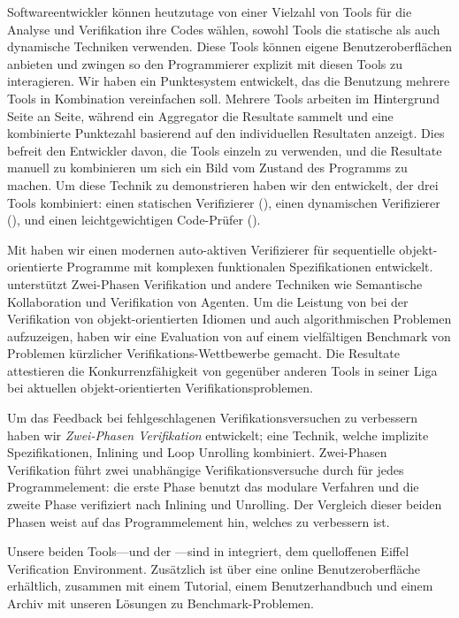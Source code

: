 Softwareentwickler k\"onnen heutzutage von einer Vielzahl von Tools f\"ur die Analyse und Verifikation ihre Codes w\"ahlen, sowohl Tools die statische als auch dynamische Techniken verwenden.
Diese Tools k\"onnen eigene Benutzeroberfl\"achen anbieten und zwingen so den Programmierer explizit mit diesen Tools zu interagieren.
Wir haben ein Punktesystem entwickelt, das die Benutzung mehrere Tools in Kombination vereinfachen soll.
Mehrere Tools arbeiten im Hintergrund Seite an Seite, w\"ahrend ein Aggregator die Resultate sammelt und eine kombinierte Punktezahl basierend auf den individuellen Resultaten anzeigt.
Dies befreit den Entwickler davon, die Tools einzeln zu verwenden, und die Resultate manuell zu kombinieren um sich ein Bild vom Zustand des Programms zu machen.
Um diese Technik zu demonstrieren haben wir den \VAssist entwickelt, der drei Tools kombiniert: einen statischen Verifizierer (\AutoProof), einen dynamischen Verifizierer (\AutoTest), und einen leichtgewichtigen Code-Pr\"ufer (\Inspector).

Mit \AutoProof haben wir einen modernen auto-aktiven Verifizierer f\"ur sequentielle objekt-orientierte Programme mit komplexen funktionalen Spezifikationen entwickelt.
\AutoProof unterst\"utzt Zwei-Phasen Verifikation und andere Techniken wie Semantische Kollaboration und Verifikation von Agenten. Um die Leistung von \AutoProof bei der Verifikation von objekt-orientierten Idiomen und auch algorithmischen Problemen aufzuzeigen, haben wir eine Evaluation von \AutoProof auf einem vielf\"altigen Benchmark von Problemen k\"urzlicher Verifikations-Wettbewerbe gemacht.
Die Resultate attestieren die Konkurrenzf\"ahigkeit von \AutoProof gegen\"uber anderen Tools in seiner Liga bei aktuellen objekt-orientierten Verifikationsproblemen.

Um das Feedback bei fehlgeschlagenen Verifikationsversuchen zu verbessern haben wir \emph{Zwei-Phasen Verifikation} entwickelt; eine Technik, welche implizite Spezifikationen, Inlining und Loop Unrolling kombiniert.
Zwei-Phasen Verifikation f\"uhrt zwei unabh\"angige Verifikationsversuche durch f\"ur jedes Programmelement: die erste Phase benutzt das modulare Verfahren und die zweite Phase verifiziert nach Inlining und Unrolling. Der Vergleich dieser beiden Phasen weist auf das Programmelement hin, welches zu verbessern ist.

Unsere beiden Tools---\AutoProof und der \VAssist---sind in \EVE integriert, dem quelloffenen Eiffel Verification Environment. Zus\"atzlich ist \AutoProof \"uber eine online Benutzeroberfl\"ache erh\"altlich, zusammen mit einem Tutorial, einem Benutzerhandbuch und einem Archiv mit unseren L\"osungen zu Benchmark-Problemen.


